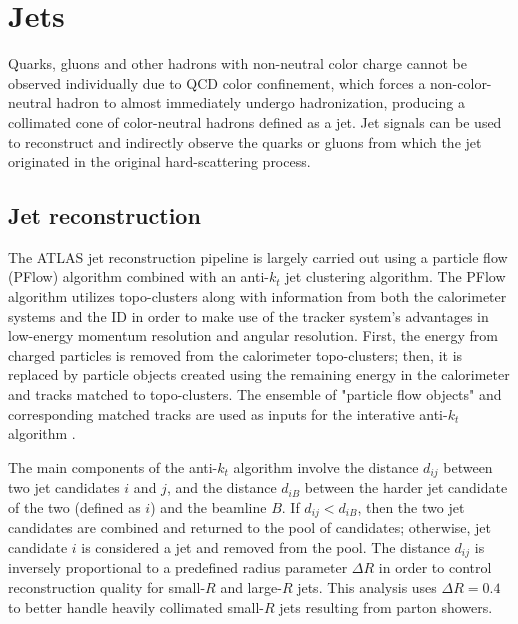 \documentclass[../thesis.tex]{subfiles}
\begin{document}
\section{Jets}
Quarks, gluons and other hadrons with non-neutral color charge cannot be observed individually due to \acs{QCD} color confinement, which forces a non-color-neutral hadron to almost immediately undergo hadronization, producing a collimated cone of color-neutral hadrons defined as a jet. Jet signals can be used to reconstruct and indirectly observe the quarks or gluons from which the jet originated in the original hard-scattering process.

\subsection{Jet reconstruction}

The ATLAS jet reconstruction pipeline is largely carried out using a particle flow (PFlow) algorithm combined with an anti-$k_t$ jet clustering algorithm. The PFlow algorithm \citep{reco:jet_pflow} utilizes topo-clusters along with information from both the calorimeter systems and the \acs{ID} in order to make use of the tracker system's advantages in low-energy momentum resolution and angular resolution. First, the energy from charged particles is removed from the calorimeter topo-clusters; then, it is replaced by particle objects created using the remaining energy in the calorimeter and tracks matched to topo-clusters. The ensemble of "particle flow objects" and corresponding matched tracks are used as inputs for the interative anti-$k_t$ algorithm \citep{reco:jet_antikt}.

The main components of the anti-$k_t$ algorithm involve the distance $d_{ij}$ between two jet candidates $i$ and $j$, and the distance $d_{iB}$ between the harder jet candidate of the two (defined as $i$) and the beamline $B$. If $d_{ij} < d_{iB}$, then the two jet candidates are combined and returned to the pool of candidates; otherwise, jet candidate $i$ is considered a jet and removed from the pool. The distance $d_{ij}$ is inversely proportional to a predefined radius parameter $\Delta R$ in order to control reconstruction quality for small-$R$ and large-$R$ jets. This analysis uses $\Delta R=0.4$ to better handle heavily collimated small-$R$ jets resulting from parton showers.
\end{document}
